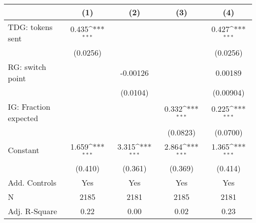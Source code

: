 {
\def\sym#1{\ifmmode^{#1}\else\(^{#1}\)\fi}
\begin{tabular}{l*{4}{c}}
\hline\hline
                    &\multicolumn{1}{c}{(1)}         &\multicolumn{1}{c}{(2)}         &\multicolumn{1}{c}{(3)}         &\multicolumn{1}{c}{(4)}         \\
\hline
TDG: tokens sent    &       0.435\sym{***}&                     &                     &       0.427\sym{***}\\
                    &    (0.0256)         &                     &                     &    (0.0256)         \\
[1em]
RG: switch point    &                     &    -0.00126         &                     &     0.00189         \\
                    &                     &    (0.0104)         &                     &   (0.00904)         \\
[1em]
IG: Fraction expected&                     &                     &       0.332\sym{***}&       0.225\sym{***}\\
                    &                     &                     &    (0.0823)         &    (0.0700)         \\
[1em]
Constant            &       1.659\sym{***}&       3.315\sym{***}&       2.864\sym{***}&       1.365\sym{***}\\
                    &     (0.410)         &     (0.361)         &     (0.369)         &     (0.414)         \\
[1em]
Add. Controls       &         Yes         &         Yes         &         Yes         &         Yes         \\
\hline
N                   &        2185         &        2181         &        2185         &        2181         \\
Adj. R-Square       &        0.22         &        0.00         &        0.02         &        0.23         \\
\hline\hline
\end{tabular}
}
